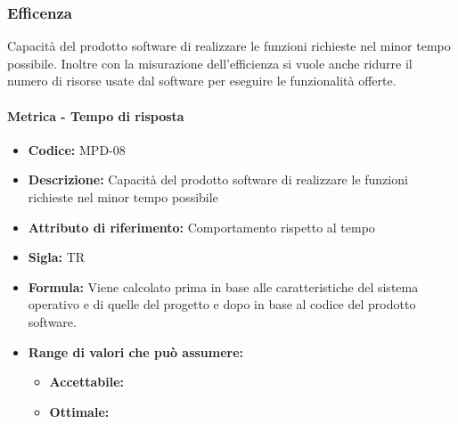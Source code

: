  \subsubsection{Efficenza}
 Capacità del prodotto software di realizzare le funzioni richieste nel minor tempo possibile. Inoltre con la misurazione dell’efficienza si vuole anche ridurre il numero di risorse usate dal software per eseguire le funzionalità offerte.
 
            \paragraph{Metrica - Tempo di risposta } 
               \begin{itemize}
          \item  \textbf{Codice:} MPD-08
          \item  \textbf{Descrizione:} Capacità del prodotto software di realizzare le funzioni richieste nel minor tempo possibile
         \item   \textbf{Attributo di riferimento:} Comportamento rispetto al tempo
         \item   \textbf{Sigla:} TR
         \item   \textbf{Formula:} Viene calcolato prima in base alle caratteristiche del sistema operativo e di quelle del progetto e dopo in base al codice del prodotto software.
                      \item \textbf{Range di valori che può assumere:}
        \begin{itemize}
            \item \textbf{Accettabile:} 
            \item \textbf{Ottimale:} 
        \end{itemize}
       \end{itemize}
              
